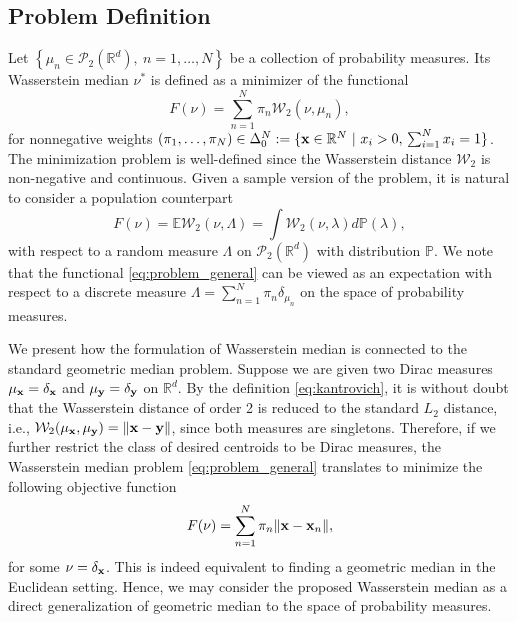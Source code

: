 \documentclass[11pt]{article}
\newcommand{\calP}{\mathcal{P}}
\newcommand{\calW}{\mathcal{W}}
\newcommand{\bbP}{\mathbb{P}}
\newcommand{\bbR}{\mathbb{R}}
\newcommand{\bbE}{\mathbb{E}}
\begin{document}
\subsection{Problem Definition}
Let $\left\lbrace \mu_n \in \calP_2 (\bbR^d),~n=1,\ldots, N \right\rbrace $ be a collection of probability measures. Its Wasserstein median $\nu^*$ is defined as a minimizer of the functional
\begin{equation}\label{eq:problem_general}
	F(\nu) = \sum_{n=1}^N \pi_n \calW_2 (\nu, \mu_n),
\end{equation}
for nonnegative weights $(\pi_1,\ldots,\pi_N) \in \Delta_0^N := \lbrace {\bf x} \in \mathbb{R}^N~|~x_i>0,\, \sum_{i=1}^N x_i = 1\rbrace $. The minimization problem is well-defined since the Wasserstein distance $\calW_2$ is non-negative and continuous.  Given a sample version of the problem, it is natural to consider a population counterpart
\begin{equation}\label{eq:problem_general_population}
	F(\nu) = \bbE \calW_2 (\nu, \Lambda) = \int \calW_2 (\nu, \lambda) d\bbP(\lambda),
\end{equation}
with respect to a random measure $\Lambda$ on $\calP_2(\bbR^d)$ with distribution $\bbP$. We note that the functional \eqref{eq:problem_general} can be viewed as an expectation with respect to a discrete measure $\Lambda = \sum_{n=1}^N \pi_n \delta_{\mu_n}$ on the space of probability measures. 



We present how the formulation of Wasserstein median is connected to the standard geometric median problem.  Suppose we are given two Dirac measures $\mu_{\bf x} = \delta_{\bf x}$ and $\mu_{\bf y} = \delta_{\bf y}$ on $\bbR^d$. By the definition \eqref{eq:kantrovich}, it is without doubt that  the Wasserstein distance of order 2 is reduced to the standard $L_2$ distance, i.e., $\mathcal{W}_2 (\mu_{\bf x},\mu_{\bf y}) = \|{\bf x}-{\bf y}\|$, since both measures are singletons. Therefore, if we further restrict the class of desired centroids to be Dirac measures, the Wasserstein median problem \eqref{eq:problem_general} translates to minimize the following objective function  
\begin{equation*}
	F(\nu) = \sum_{n=1}^N \pi_n \| {\bf x} - {\bf x}_n \|,
\end{equation*}
for some $\nu = \delta_{\bf x}$. This is indeed equivalent to finding a geometric median in the Euclidean setting. Hence, we may consider the proposed Wasserstein median as a direct generalization of geometric median to the space of probability measures. 
\end{document}
